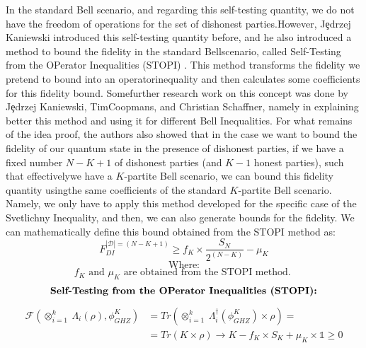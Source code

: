 \documentclass[12pt]{article}
\begin{document}
    
    \noindent In the standard Bell scenario, and regarding this self-testing quantity, we do not have the freedom of operations for the set of dishonest parties.\break However, J\c{e}drzej Kaniewski introduced this self-testing quantity before, and he also introduced a method to bound the fidelity in the standard Bell\break scenario, called Self-Testing from the OPerator Inequalities (STOPI) \cite{kaniewski:analytic-nearly-optimal-self-testing-bounds-clauser-horne-shimony-holt-and-mermin-inequalities:2016:02-2024,coopmans-kaniewski-schaffner:robust-self-testing-two-qubit-states:2019:02-2024}. This method transforms the fidelity we pretend to bound into an operator\break inequality and then calculates some coefficients for this fidelity bound. Some\break further research work on this concept was done by J\c{e}drzej Kaniewski, Tim\break Coopmans, and Christian Schaffner, namely in explaining better this method and using it for different Bell Inequalities. For what remains of the idea proof, the authors also showed that in the case we want to bound the fidelity of our quantum state in the presence of dishonest parties, if we have a fixed number $N - K + 1$ of dishonest parties (and $K - 1$ honest parties), such that effectively\break we have a $K$-partite Bell scenario, we can bound this fidelity quantity using\break the same coefficients of the standard $K$-partite Bell scenario. Namely, we only have to apply this method developed for the specific case of the Svetlichny Inequality, and then, we can also generate bounds for the fidelity. We can mathematically define this bound obtained from the STOPI method as:
    $$ {F}_{DI}^{|\mathcal{D}| = (N - K + 1)} \geq {f}_{K} \times \frac{{S}_{N}}{{2}^{(N - K)}} - {\mu}_{K} $$
    $$ \mathrm{\text{Where:}} $$
    $$ {f}_{K} \mathrm{\text{ and }} {\mu}_{K} \mathrm{\text{ are obtained from the STOPI method. }} $$
    \vspace{-1.75ex}
    $$ \mathrm{\text{\textbf{Self-Testing from the OPerator Inequalities (STOPI):}}} $$
    \begin{equation*}
        \begin{aligned}
            \mathcal{F}\left( {\otimes}_{i = 1}^{k}\ {\Lambda}_{i}(\rho), {\phi}_{GHZ}^{K} \right) & = Tr\left( {\otimes}_{i = 1}^{k}\ {\Lambda}_{i}^{\dagger} \left( {\phi}_{GHZ}^{K} \right) \times \rho \right) = \\
            & = Tr(K \times \rho) \rightarrow K - {f}_{K} \times {S}_{K} + {\mu}_{K} \times \mathds{1} \geq 0
        \end{aligned}
    \end{equation*}
\end{document}
